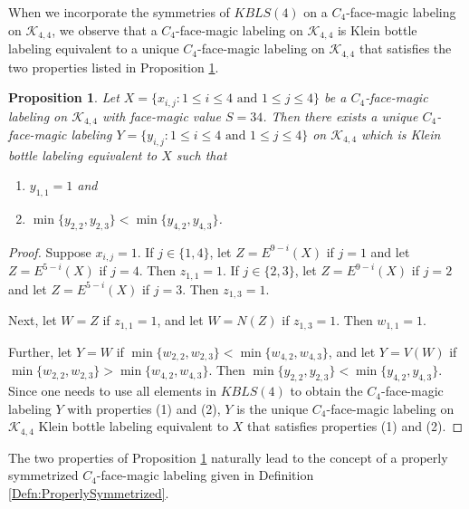 \documentclass[10pt, reqno]{amsart}
\theoremstyle{definition}
\theoremstyle{plain}
\newtheorem{proposition}[definition]{Proposition}
\begin{document}
When we incorporate the symmetries of $\mathit{KBLS}(4)$
on a $C_4$-face-magic labeling on $\mathcal{K}_{4,4}$,
we observe that a $C_4$-face-magic labeling
on $\mathcal{K}_{4,4}$ is Klein bottle labeling equivalent
to a unique $C_4$-face-magic labeling
on $\mathcal{K}_{4,4}$ that satisfies the two properties 
listed in Proposition \ref{prop:LabelEquiv}.

\begin{proposition}\label{prop:LabelEquiv}
    Let  $X=\{x_{i,j}: 1\le i \le 4 \text{ and } 
   1\le j \le 4\}$ be a $C_4$-face-magic labeling 
   on  $\mathcal{K}_{4,4}$ with face-magic value $S=34$.
   Then there exists a unique 
   $C_4$-face-magic labeling 
   $Y=\{y_{i,j}: 1\le i \le 4 \text{ and } 
   1\le j \le 4\}$ 
   on  $\mathcal{K}_{4,4}$
  which is Klein bottle labeling equivalent to $X$ such that
   \begin{enumerate}
       \item $y_{1,1}=1$ and
        \item $\min\{ y_{2,2},y_{2,3}\}
        <\min\{ y_{4,2},y_{4,3}\}$.
   \end{enumerate}
\end{proposition}

\begin{proof}
   Suppose $x_{i,j}=1$. If $j\in \{1,4\}$, let $Z=E^{9-i}(X)$ if $j=1$ and
   let $Z=E^{5-i}(X)$ if $j=4$. Then $z_{1,1}=1$.
   If $j\in \{2,3\}$, let $Z=E^{9-i}(X)$ if $j=2$ and
   let $Z=E^{5-i}(X)$ if $j=3$. Then $z_{1,3}=1$.

   Next, let $W=Z$ if $z_{1,1}=1$, and
        let $W=N(Z)$ if $z_{1,3}=1$. 
        Then  $w_{1,1}=1$.

   Further, let $Y=W$ if $\min\{ w_{2,2},w_{2,3}\}
        <\min\{ w_{4,2},w_{4,3}\}$, and
        let $Y=V(W)$ if $\min\{ w_{2,2},w_{2,3}\}
        >\min\{ w_{4,2},w_{4,3}\}$. 
        Then  $\min\{ y_{2,2},y_{2,3}\}
        <\min\{ y_{4,2},y_{4,3}\}$.
        Since one needs to use all elements in
        $\mathit{KBLS}(4)$ to obtain the $C_4$-face-magic
        labeling $Y$ with properties (1) and (2),
        $Y$ is the unique $C_4$-face-magic labeling on $\mathcal{K}_{4,4}$
        Klein bottle labeling equivalent to $X$
         that satisfies properties (1) and (2).
\end{proof}

The two properties of Proposition \ref{prop:LabelEquiv} 
naturally lead to the concept of a properly symmetrized 
$C_4$-face-magic labeling given in
Definition \ref{Defn:ProperlySymmetrized}.
\end{document}
